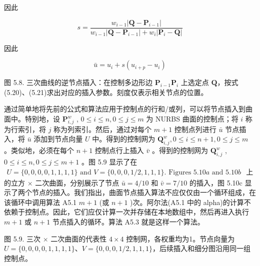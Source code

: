 \documentclass[../main.tex]{subfiles}
\begin{document}
因此

\[
s = \frac{{w}_{i - 1}\left| {\mathbf{Q} - {\mathbf{P}}_{i - 1}}\right| }{{w}_{i - 1}\left| {\mathbf{Q} - {\mathbf{P}}_{i - 1}}\right|  + {w}_{i}\left| {{\mathbf{P}}_{i} - \mathbf{Q}}\right| } \tag{5.20}
\]

因此

\[
\bar{u} = {u}_{i} + s\left( {{u}_{i + p} - {u}_{i}}\right)  \tag{5.21}
\]

\begin{center}
\begin{minipage}{18cm}
\vspace*{.6\baselineskip}
\centering
{}
\par\smallskip
图 5.8. 三次曲线的逆节点插入：在控制多边形边 \(\mathbf P_{i-1}\mathbf P_i\) 上选定点 \(\mathbf Q\)，按式(5.20)、(5.21)求出对应的插入参数。刻度仅表示相关节点的位置。
\end{minipage}
\end{center}

通过简单地将先前的公式和算法应用于控制点的行和/或列，可以将节点插入到曲面中。特别地，设 \({\mathbf{P}}_{i,j}^{w}\) , \(0 \leq  i \leq  n,0 \leq  j \leq  m\) 为 NURBS 曲面的控制点；将 \(i\) 称为行索引，将 \(j\) 称为列索引。然后，通过对每个 \(m + 1\) 控制点列进行 \(\bar{u}\) 节点插入，将 \(\bar{u}\) 添加到节点向量 \(U\) 中。得到的控制网为 \({\mathbf{Q}}_{i,j}^{w},0 \leq  i \leq  n + 1,0 \leq  j \leq  m\) 。类似地，必须在每个 \(n + 1\) 控制点行上插入 \(\bar{v}\) 。得到的控制网为 \({\mathbf{Q}}_{i,j}^{w}\) , \(0 \leq  i \leq  n,0 \leq  j \leq  m + 1\) 。图 5.9 显示了在 \(\begin{matrix} U = \{ 0,0,0,0,1,1,1,1\} \text{ and }V = \{ 0,0,0,1/2,1,1,1\} .\text{ Figures }{5.10a}\text{ and }{5.10b} \end{matrix}\) 上的立方 \(\times\) 二次曲面，分别展示了节点 \(\bar{u} = 4/{10}\) 和 \(\bar{v} = 7/{10}\) 的插入，图 5.10c 显示了两个节点的插入。我们指出，曲面节点插入算法不应仅仅由一个循环组成，在该循环中调用算法 A5.1 \(m + 1\) (或 \(n + 1\) )次。阿尔法(A5.1 中的 alpha)的计算不依赖于控制点。因此，它们应仅计算一次并存储在本地数组中，然后再进入执行 \(m + 1\) 或 \(n + 1\) 节点插入的循环。算法 A5.3 就是这样一个算法。



\begin{center}
\begin{minipage}{18cm}
\vspace*{.6\baselineskip}
\centering
{}
\par\smallskip
图 5.9. 三次 \(\times\) 二次曲面的代表性 \(4\times4\) 控制网，各权重均为1。节点向量为 \(U=\{0,0,0,0,1,1,1,1\}\)、\(V=\{0,0,0,1/2,1,1,1\}\)，后续插入和细分图沿用同一组控制点。
\end{minipage}
\end{center}
\end{document}
